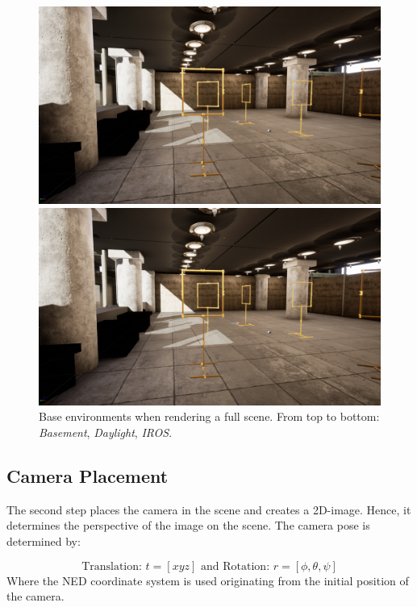 \begin{figure}[hbtp]
\begin{minipage}{0.49\textwidth}
	\includegraphics[width=\textwidth]{fig/iros_perspective}
\end{minipage}
\begin{minipage}{0.49\textwidth}
	\includegraphics[width=\textwidth]{fig/iros_perspective}
\end{minipage}
\caption{Base environments when rendering a full scene. From top to bottom: \textit{Basement}, \textit{Daylight}, \textit{IROS}.}
\label{fig:environments}
\end{figure}

\subsection{Camera Placement}

The second step places the camera in the scene and creates a 2D-image. Hence, it determines the perspective of the image on the scene. The camera pose is determined by:

$$
\text{Translation: }t = [x y z] \text{ and Rotation: } r = [\phi, \theta, \psi]
$$
Where the \ac{NED} coordinate system is used originating from the initial position of the camera. 


